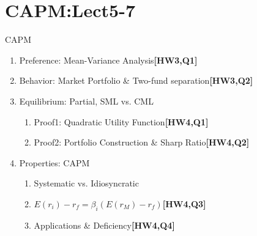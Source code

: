 \documentclass{beamer}
\begin{document}
\section{CAPM:Lect5-7}
  \label{sec:PE-Model}
    \begin{frame}{CAPM}
    \begin{enumerate}
    	\item Preference: Mean-Variance Analysis\textbf{[HW3,Q1]}
    	\item Behavior: Market Portfolio \& Two-fund separation\textbf{[HW3,Q2]}
		\item Equilibrium: Partial, SML vs. CML
			\begin{enumerate}
				\item Proof1: Quadratic Utility Function\textbf{[HW4,Q1]}
				\item Proof2: Portfolio Construction \& Sharp Ratio\textbf{[HW4,Q2]}
			\end{enumerate}
    	\item Properties: CAPM
    		\begin{enumerate}
    			\item Systematic vs. Idiosyncratic
				\item $E(r_i)-r_f=\beta_i(E(r_M)-r_f)$\textbf{[HW4,Q3]}
				\item Applications \& Deficiency\textbf{[HW4,Q4]}
    		\end{enumerate}
    \end{enumerate}
	\end{frame}

\end{document}
